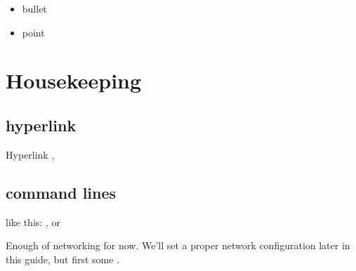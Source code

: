 \documentclass[letterpaper,10pt,english]{sphinxmanual}
\begin{document}
\begin{itemize}
\item {} 
bullet

\item {} 
point

\end{itemize}


\section{Housekeeping}
\label{\detokenize{networkmaint:housekeeping}}\label{\detokenize{networkmaint::doc}}

\subsection{hyperlink}
\label{\detokenize{networkmaint:hyperlink}}
Hyperlink ,


\subsection{command lines}
\label{\detokenize{networkmaint:command-lines}}
like this: ,  or

Enough of networking for now. We’ll set a proper network configuration later in this guide, but first some .
\end{document}

